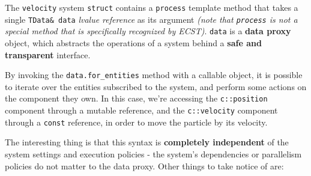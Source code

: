 \documentclass[twoside, 12pt, a4paper, openright]{book}
\begin{document}
The
\texttt{velocity}
system
\texttt{struct}
contains a
\texttt{process}
template method that takes a single
\texttt{TData& data}
\emph{lvalue reference} as its argument \emph{(note that
\texttt{process}
is not a special method that is specifically recognized by ECST)}.
\texttt{data}
is a \textbf{data proxy} object, which abstracts the operations of a
system behind a \textbf{safe and transparent} interface.

By invoking the
\texttt{data.for_entities}
method with a callable object, it is possible to iterate over the
entities subscribed to the system, and perform some actions on the
component they own. In this case, we're accessing the
\texttt{c::position}
component through a mutable reference, and the
\texttt{c::velocity}
component through a
\texttt{const}
reference, in order to move the particle by its velocity.

The interesting thing is that this syntax is \textbf{completely
independent} of the system settings and execution policies - the
system's dependencies or parallelism policies do not matter to the data
proxy. Other things to take notice of are:
\end{document}

